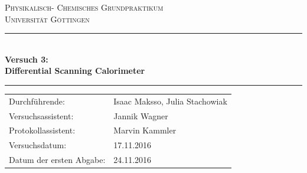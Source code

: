 \documentclass[12pt,a4paper,titlepage,headinclude,bibtotoc]{scrartcl}
\begin{document}
\begin{titlepage}
\centering
\textsc{\Large Physikalisch- Chemisches Grundpraktikum\\[1.5ex] Universität Göttingen}

\vspace*{0.5cm}

\rule{\textwidth}{1pt}\\[0.5cm]
{\huge \bfseries
  Versuch 3: \\[1.5ex]
  Differential Scanning Calorimeter}\\[0.5cm]
\rule{\textwidth}{1pt}

\vspace*{0.5cm}


\begin{Large}
\begin{tabular}{ll}
Durchführende: &  Isaac Maksso, Julia Stachowiak\\
Versuchsassistent: & Jannik Wagner \\
Protokollassistent:& Marvin Kammler\\
 Versuchsdatum: & 17.11.2016\\
 Datum der ersten Abgabe: & 24.11.2016\\
\end{tabular}
\end{Large}

\vspace*{0.5cm}




\vspace{1.3cm} 
\end{titlepage}


\tableofcontents %
\newpage
\end{document}
